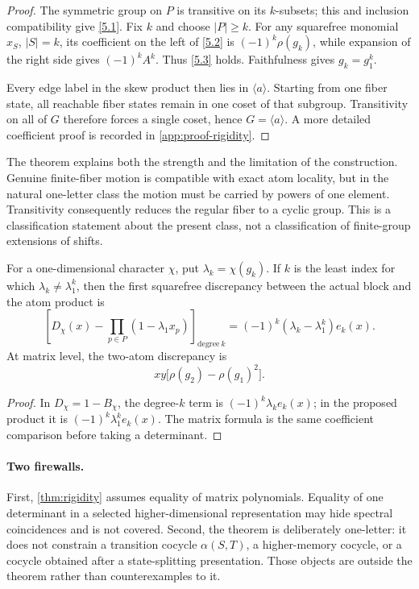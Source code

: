 \begin{proof}
The symmetric group on \(P\) is transitive on its \(k\)-subsets; this and
inclusion compatibility give \eqref{5.1}.  Fix \(k\) and choose
\(|P|\ge k\).  For any squarefree monomial \(x_S\), \(|S|=k\), its
coefficient on the left of \eqref{5.2} is
\((-1)^k\rho(g_k)\), while expansion of the right side gives
\((-1)^kA^k\).  Thus \eqref{5.3} holds.  Faithfulness gives
\(g_k=g_1^k\).

Every edge label in the skew product then lies in \(\langle a\rangle\).
Starting from one fiber state, all reachable fiber states remain in one
coset of that subgroup.  Transitivity on all of \(G\) therefore forces a
single coset, hence \(G=\langle a\rangle\).  A more detailed coefficient
proof is recorded in \cref{app:proof-rigidity}.
\end{proof}

The theorem explains both the strength and the limitation of the construction.
Genuine finite-fiber motion is compatible with exact atom locality, but in the
natural one-letter class the motion must be carried by powers of one element.
Transitivity consequently reduces the regular fiber to a cyclic group.  This
is a classification statement about the present class, not a classification
of finite-group extensions of shifts.

\begin{corollary}
\label{cor:first-leak}
For a one-dimensional character \(\chi\), put
\(\lambda_k=\chi(g_k)\).  If \(k\) is the least index for which
\(\lambda_k\ne\lambda_1^k\), then the first squarefree discrepancy between
the actual block and the atom product is
\[
\left[
D_\chi(x)-\prod_{p\in P}(1-\lambda_1x_p)
\right]_{\mathrm{degree}\ k}
=(-1)^k(\lambda_k-\lambda_1^k)e_k(x).
\tag{5.5}\label{5.5}
\]
At matrix level, the two-atom discrepancy is
\[
xy\bigl[\rho(g_2)-\rho(g_1)^2\bigr].
\tag{5.6}\label{5.6}
\]
\end{corollary}

\begin{proof}
In \(D_\chi=1-B_\chi\), the degree-\(k\) term is
\((-1)^k\lambda_ke_k(x)\); in the proposed product it is
\((-1)^k\lambda_1^ke_k(x)\).  The matrix formula is the same coefficient
comparison before taking a determinant.
\end{proof}

\paragraph{Two firewalls.}
First, \cref{thm:rigidity} assumes equality of matrix polynomials.  Equality
of one determinant in a selected higher-dimensional representation may hide
spectral coincidences and is not covered.  Second, the theorem is deliberately
one-letter: it does not constrain a transition cocycle
\(\alpha(S,T)\), a higher-memory cocycle, or a cocycle obtained after a
state-splitting presentation.  Those objects are outside the theorem rather
than counterexamples to it.

